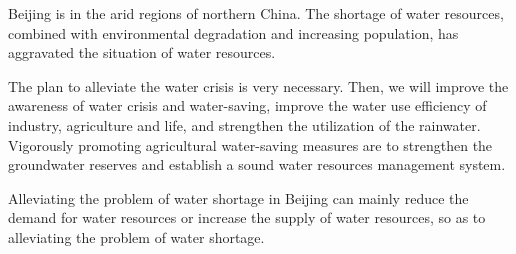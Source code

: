 \documentclass{mcmthesis}
\begin{document}
\par Beijing is in the arid regions of northern China. The shortage of water resources, combined with environmental degradation and increasing population, has aggravated the situation of water resources.

\par The plan to alleviate the water crisis is very necessary. Then, we will improve the awareness of water crisis and water-saving, improve the water use efficiency of industry, agriculture and life, and strengthen the utilization of  the rainwater. Vigorously promoting agricultural water-saving measures are to strengthen the groundwater reserves and establish a sound water resources management system.

\par Alleviating the problem of water shortage in Beijing can mainly reduce the demand for water resources or increase the supply of water resources, so as to alleviating the problem of water shortage.
\end{document}
